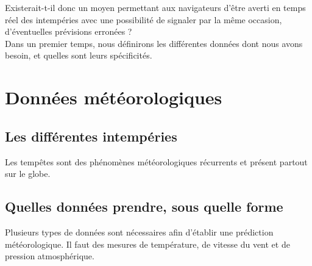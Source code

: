 \documentclass[12pt]{report}
\begin{document}
    Existerait-t-il donc un moyen permettant aux navigateurs d’être averti en temps réel des intempéries avec une possibilité de signaler par la même occasion, d’éventuelles prévisions erronées ?\\

    Dans un premier temps, nous définirons les différentes données dont nous avons besoin, et quelles sont leurs spécificités.

    \clearpage

\section{Données météorologiques}

    \subsection{Les différentes intempéries}

        Les tempêtes sont des phénomènes météorologiques récurrents et présent partout sur le globe.


    \subsection{Quelles données prendre, sous quelle forme}
    
        Plusieurs types de données sont nécessaires afin d'établir une prédiction météorologique. Il faut des mesures de température, de vitesse du vent et de pression atmosphérique.
     

    \newpage
\end{document}
